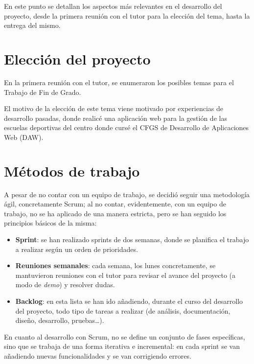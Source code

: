 
En este punto se detallan los aspectos más relevantes en el desarrollo del proyecto, desde la primera reunión con el tutor para la
elección del tema, hasta la entrega del mismo.

\section{Elección del proyecto}\label{sec:eleccion-del-proyecto}

En la primera reunión con el tutor, se enumeraron los posibles temas para el Trabajo de Fin de Grado.

El motivo de la elección de este tema viene motivado por experiencias de desarrollo pasadas, donde realicé una aplicación
web para la gestión de las escuelas deportivas del centro donde cursé el CFGS de Desarrollo de Aplicaciones Web (DAW).

\section{Métodos de trabajo}\label{sec:metodos-de-trabajo}

A pesar de no contar con un equipo de trabajo, se decidió seguir una metodología ágil, concretamente Scrum; al no
contar, evidentemente, con un equipo de trabajo, no se ha aplicado de una manera estricta, pero se han seguido los
principios básicos de la misma:
\begin{itemize}
    \item \textbf{Sprint}: se han realizado sprints de dos semanas, donde se planifica el trabajo a realizar
    según un orden de prioridades.
    \item \textbf{Reuniones semanales}: cada semana, los lunes concretamente, se mantuvieron reuniones con el tutor
    para revisar el avance del proyecto (a modo de \textit{demo}) y resolver dudas.
    \item \textbf{Backlog}: en esta lista se han ido añadiendo, durante el curso del desarrollo del proyecto,
    todo tipo de tareas a realizar (de análisis, documentación,
    diseño, desarrollo, pruebas\ldots).
\end{itemize}

En cuanto al desarrollo con Scrum, no se define un conjunto de fases específicas, sino que se trabaja de una forma
iterativa e incremental: en cada sprint se van añadiendo nuevas funcionalidades y se van corrigiendo errores.

